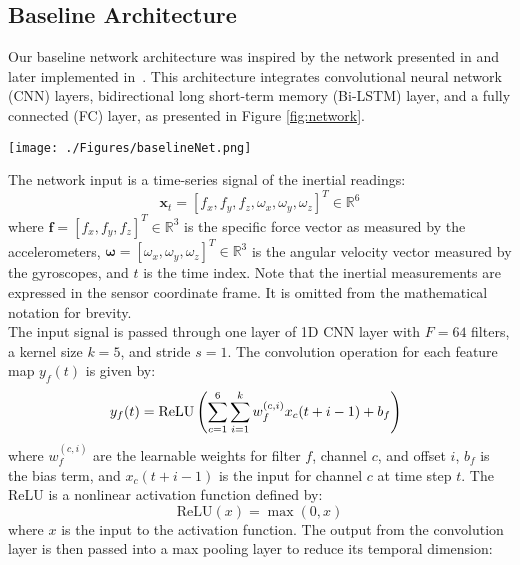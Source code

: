 \documentclass[journal]{IEEEtran}
\begin{document}
\subsection {Baseline Architecture} \label{sec:baseline_net}
\noindent Our baseline network architecture was inspired by the network presented in \cite{silva2019end} and later implemented in~\cite{fekson2025enhancement}. This architecture integrates convolutional neural network (CNN) layers, bidirectional long short-term memory (Bi-LSTM) layer, and a fully connected (FC) layer, as presented in Figure \ref{fig:network}.
%
\begin{figure*}[!htb]
    \centering
    \texttt{[image: ./Figures/baselineNet.png]}
    \caption{Baseline network architecture. The output differs between each task and dataset.}
    \label{fig:network}
\end{figure*}
%
The network input is a time-series signal of the inertial readings:
\begin{equation}
\textbf{x}_t = [f_x, f_y, f_z,\omega_x,\omega_y,\omega_z]^{T}\in\mathbb{R}^6
\end {equation}
where $\textbf{f}=[f_x, f_y, f_z]^{T}\in\mathbb{R}^3$ is the specific force vector as measured by the accelerometers, $\boldsymbol{\omega} = [\omega_x,\omega_y,\omega_z]^{T}\in\mathbb{R}^3$ is the angular velocity vector measured by the gyroscopes, and \(t\) is the time index. Note that the inertial measurements are expressed in the sensor coordinate frame. It is omitted from the mathematical notation for brevity.\\
%
\noindent The input signal is passed through one layer of 1D CNN layer with \(F=64\) filters, a kernel size \(k = 5\), and stride \(s=1\). The convolution operation for each feature map \(y_f(t)\) is given by:
\begin{equation}
\hspace{-0.2cm} %
y_f(t) = \mathrm{ReLU}\left(\sum_{c=1}^6 \sum_{i=1}^k w_f^{(c,i)} x_c(t+i-1) + b_f\right)
\end {equation}
where \(w_f^{(c,i)}\) are the learnable weights for filter \(f\), channel \(c\), and offset \(i\), \(b_f\) is the bias term, and \(x_c(t+i-1)\) is the input for channel \(c\) at time step \(t\).
The ReLU is a nonlinear activation function defined by:
\begin{equation}
\mathrm{ReLU}(x) = \max(0, x)
\end {equation}
where $x$ is the input to the activation function. 
The output from the convolution layer is then passed into a max pooling layer to reduce its temporal dimension:
\end{document}
